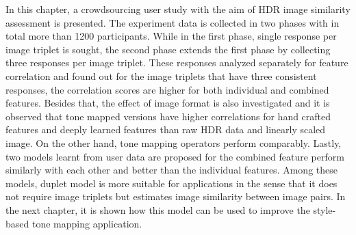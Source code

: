 In this chapter, a crowdsourcing user study with the aim of HDR image similarity assessment is presented. The experiment data is collected in two phases with in total more than 1200 participants. While in the first phase, single response per image triplet is sought, the second phase extends the first phase by collecting three responses per image triplet. These responses analyzed separately for feature correlation and found out for the image triplets that have three consistent responses, the correlation scores are higher for both individual and combined features. Besides that, the effect of image format is also investigated and it is observed that tone mapped versions have higher correlations for hand crafted features and deeply learned features than raw HDR data and linearly scaled image. On the other hand, tone mapping operators perform comparably. Lastly, two models learnt from user data are proposed for the combined feature perform similarly with each other and better than the individual features. Among these models, duplet model is more suitable for applications in the sense that it does not require image triplets but estimates image similarity between image pairs. In the next chapter, it is shown how this model can be used to improve the style-based tone mapping application.